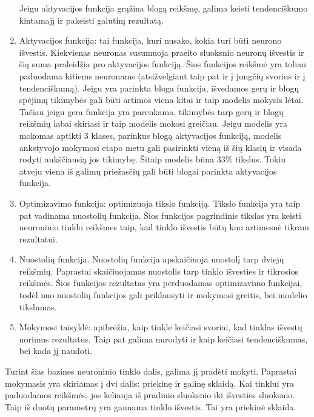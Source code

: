 \documentclass{VUMIFInfKursinis}
\begin{document}
\begin{enumerate}
  Jeigu aktyvacijos funkcija grąžina blogą reikšmę, galima keisti tendenciškumo kintamajį ir
  pakeisti galutinį rezultatą.
  \item Aktyvacijos funkcija: tai funkcija, kuri nusako, kokia turi būti neurono išvestis. Kiekvienas neuronas
  susumuoja praeito sluoksnio neuronų išvestis ir šią suma praleidžia pro aktyvacijos funkciją.
  Šios funkcijos reikšmė yra toliau paduodama kitiems neuronams (atsižvelgiant taip pat ir į
  jungčių svorius ir į tendenciškumą).
    Jeigu yra parinkta bloga funkcija, išvedamos gerų ir blogų spėjimų tikimybės gali būti artimos viena kitai ir taip modelis mokysis lėtai. Tačiau jeigu gera funkcija yra parenkama, tikimybės tarp gerų ir blogų reikšmių labai skiriasi ir taip modelis mokosi greičiau.
    Jeigu modelis yra mokomas aptikti 3 klases, parinkus blogą aktyvacijos
    funkciją, modelis ankstyvojo mokymosi etapo metu gali pasirinkti vieną
    iš šių klasių ir visada rodyti aukščiausią jos tikimybę. Šitaip modelis būna 33\% tikslus. Tokiu atveju viena iš galimų priežasčių gali būti blogai parinkta aktyvacijos funkcija. 
  \item Optimizavimo funkcija: optimizuoja tikslo funkciją. Tikslo funkcija yra taip pat vadinama nuostolių funkcija.
  Šios funkcijos pagrindinis tikslas yra keisti neuroninio tinklo reikšmes taip, kad tinklo išvestis būtų
  kuo artimesnė tikram rezultatui.
  \item Nuostolių funkcija. Nuostolių funkcija apskaičiuoja nuostolį tarp dviejų reikšmių. Paprastai skaičiuojamas nuostolis tarp tinklo išvesties ir tikrosios reikšmės. Šios funkcijos rezultatas yra perduodamas optimizavimo funkcijai, todėl nuo nuostolių funkcijos gali priklausyti ir mokymosi greitis, bei modelio tikslumas.
  \item Mokymosi taisyklė: apibrėžia, kaip tinkle keičiasi svoriai, kad tinklas išvestų norimus rezultatus.
  Taip pat galima nurodyti ir kaip keičiasi tendenciškumas, bei kada jį naudoti.
\end{enumerate}
\par
Turint šias bazines neuroninio tinklo dalis, galima jį pradėti mokyti. Paprastai mokymasis
yra skiriamas į dvi dalis: priekinę ir galinę sklaidą.
Kai tinklui yra paduodamos reikšmės, jos keliauja iš pradinio sluoksnio iki išvesties sluoksnio. Taip iš duotų parametrų yra gaunama tinklo išvestis. Tai
yra priekinė sklaida.
\end{document}

